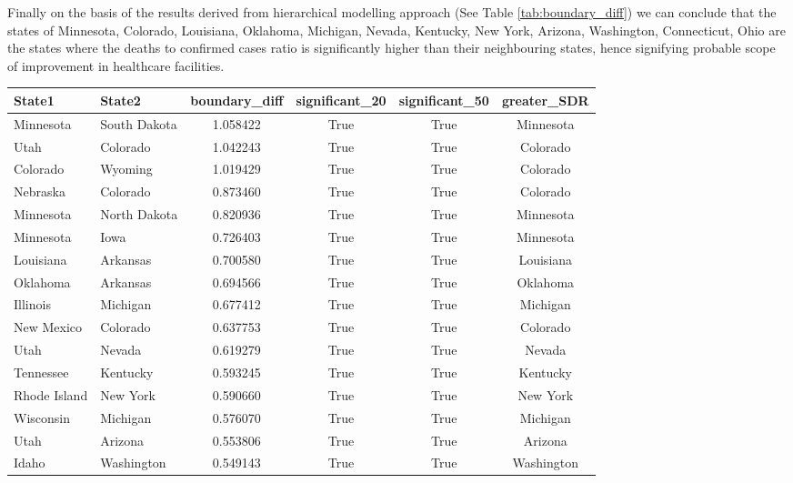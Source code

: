 \documentclass[enabledeprecatedfontcommands,parskip=half,twoside=semi,BCOR=0mm]{scrreprt}
\numberwithin{equation}{chapter}
\theoremstyle{definition}
\theoremstyle{remark}
\begin{document}
    
    Finally on the basis of the results derived from hierarchical modelling approach (See Table \ref{tab:boundary_diff})  we can conclude that the states of Minnesota, Colorado, Louisiana, Oklahoma, Michigan, Nevada, Kentucky, New York, Arizona, Washington, Connecticut, Ohio are the states where the deaths to confirmed cases ratio is significantly higher than their neighbouring states, hence signifying probable scope of improvement in healthcare facilities.
    \begin{table}[h!]
    \centering
    \begin{adjustbox}{max width=\textwidth}
    \begin{tabular}{|l|l|c|c|c|c|}
        \hline
        \textbf{State1} & \textbf{State2} & \textbf{boundary\_diff} & \textbf{significant\_20} & \textbf{significant\_50} & \textbf{greater\_SDR} \\
        \hline
        Minnesota & South Dakota & 1.058422 & True & True & Minnesota \\
        Utah & Colorado & 1.042243 & True & True & Colorado \\
        Colorado & Wyoming & 1.019429 & True & True & Colorado \\
        Nebraska & Colorado & 0.873460 & True & True & Colorado \\
        Minnesota & North Dakota & 0.820936 & True & True & Minnesota \\
        Minnesota & Iowa & 0.726403 & True & True & Minnesota \\
        Louisiana & Arkansas & 0.700580 & True & True & Louisiana \\
        Oklahoma & Arkansas & 0.694566 & True & True & Oklahoma \\
        Illinois & Michigan & 0.677412 & True & True & Michigan \\
        New Mexico & Colorado & 0.637753 & True & True & Colorado \\
        Utah & Nevada & 0.619279 & True & True & Nevada \\
        Tennessee & Kentucky & 0.593245 & True & True & Kentucky \\
        Rhode Island & New York & 0.590660 & True & True & New York \\
        Wisconsin & Michigan & 0.576070 & True & True & Michigan \\
        Utah & Arizona & 0.553806 & True & True & Arizona \\
        Idaho & Washington & 0.549143 & True & True & Washington \\

\end{tabular}
\end{adjustbox}
\end{table}
\end{document}
